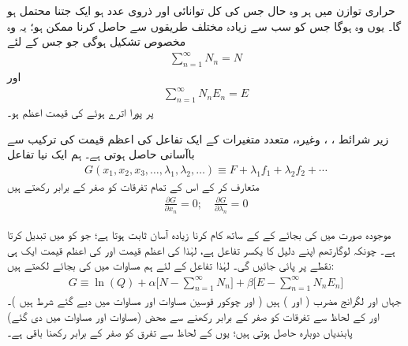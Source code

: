 حراری توازن میں ہر وہ حال جس کی کل توانائی  اور ذروی عدد  ہو ایک جتنا محتمل ہو گا۔ یوں   وہ ہوگا جس کو سب سے زیادہ مختلف طریقوں سے حاصل کرنا ممکن ہو؛ یہ وہ مخصوص تشکیل ہوگی جو جس کے لئے 
\begin{align}\label{مساوات_متماثل_شرط_الف}
\sum_{n = 1}^{\infty} N_n = N
\end{align}
اور 
\begin{align}\label{مساوات_متماثل_شرط_ب}
\sum_{n = 1}^{\infty} N_n E_n = E
\end{align}
پر پورا اترے ہوئے  کی قیمت اعظم ہو۔

 زیر شرائط ، ، وغیرہ، متعدد متغیرات کے ایک تفاعل  کی اعظم قیمت  کی ترکیب سے باآسانی حاصل ہوتی ہے۔ ہم ایک نیا تفاعل 
\begin{align}\label{مساوات_متماثل_لگرانج_الف}
G (x_1 , x_2 , x_3 , \dotsc , \lambda_1 , \lambda_2 , \dotsc) \equiv F + \lambda_1 f_1 + \lambda_2 f_2 + \cdots
\end{align}
متعارف کر کے اس کے تمام تفرقات کو صفر کے برابر رکھتے ہیں 
\begin{align}
\frac{\partial G}{\partial x_n} = 0; \quad \frac{\partial G}{\partial \lambda_n} = 0
\end{align}

موجودہ صورت میں  کی بجائے  کے  کے ساتھ کام کرنا زیادہ آسان ثابت ہوتا ہے؛ جو  کو  میں تبدیل کرتا ہے۔ چونکہ لوگارتھم اپنے دلیل کا یکسر تفاعل ہے، لہٰذا  کی اعظم قیمت اور  کی اعظم قیمت ایک ہی نقطے پر پائی جائیں گی۔ لہٰذا تفاعل  کے لئے ہم مساوات  میں  کی بجائے  لکھتے ہیں:
\begin{align}\label{مساوات_متماثل_لگرانج_ب}
G \equiv \ln(Q) + \alpha \big [ N - \sum_{n = 1}^{\infty} N_n \big ] + \beta \big [ E - \sum_{n = 1}^{\infty} N_n E_n \big ]
\end{align}
جہاں  اور  لگرانج مضرب ( اور ) ہیں ( اور چوکور قوسین مساوات  اور مساوات  میں دیے گئے شرط ہیں )۔  اور  کے لحاظ سے تفرقات کو صفر کے برابر رکھنے سے محض (مساوات  اور مساوات  میں دی گئے) پابندیاں دوبارہ حاصل ہوتی ہیں؛ یوں  کے لحاظ سے تفرق کو صفر کے برابر رکھنا باقی ہے۔

